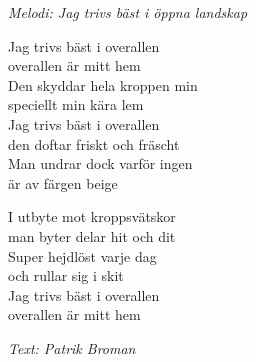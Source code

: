 {\footnotesize\textit{Melodi: Jag trivs bäst i öppna landskap}}\par
\vspace{10pt}
Jag trivs bäst i overallen\\
overallen är mitt hem\\
Den skyddar hela kroppen min\\
speciellt min kära lem\\
Jag trivs bäst i overallen\\
den doftar friskt och fräscht\\
Man undrar dock varför ingen\\
är av färgen beige\par
\vspace{10pt}
I utbyte mot kroppsvätskor\\
man byter delar hit och dit\\
Super hejdlöst varje dag\\
och rullar sig i skit\\
Jag trivs bäst i overallen\\
overallen är mitt hem\par
\vspace{10pt}
{\footnotesize\textit{Text: Patrik Broman}}
